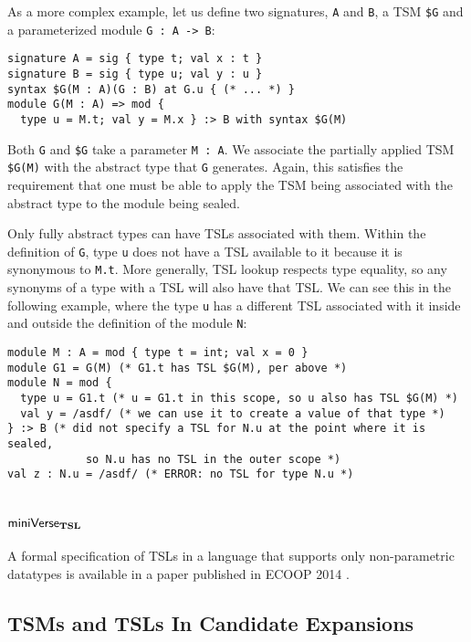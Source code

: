 As a more complex example, let us define two signatures, \lstinline{A} and \lstinline{B}, a TSM \texttt{\$G} and a parameterized module \lstinline{G : A -> B}:
\begin{lstlisting}[numbers=none,mathescape=|]
signature A = sig { type t; val x : t }
signature B = sig { type u; val y : u }
syntax $G(M : A)(G : B) at G.u { (* ... *) }
module G(M : A) => mod { 
  type u = M.t; val y = M.x } :> B with syntax $G(M)
\end{lstlisting}
Both \lstinline{G} and \texttt{\$G} take a parameter \lstinline{M : A}. We associate the partially applied TSM \texttt{\$G(M)} with the abstract type that \lstinline{G} generates. Again, this satisfies the requirement that one must be able to apply the TSM being associated with the abstract type to the module being sealed. 

Only fully abstract types can have TSLs associated with them. Within the definition of \lstinline{G}, type \lstinline{u} does not have a TSL available to it because it is synonymous to \lstinline{M.t}. More generally, TSL lookup respects type equality, so any synonyms of a type with a TSL will also have that TSL. We can see this in the following example, where the type \lstinline{u} has a different TSL associated with it inside and outside the definition of the module \lstinline{N}:
\begin{lstlisting}[numbers=none,mathescape=|]
module M : A = mod { type t = int; val x = 0 }
module G1 = G(M) (* G1.t has TSL $G(M), per above *)
module N = mod { 
  type u = G1.t (* u = G1.t in this scope, so u also has TSL $G(M) *)
  val y = /asdf/ (* we can use it to create a value of that type *) 
} :> B (* did not specify a TSL for N.u at the point where it is sealed, 
            so N.u has no TSL in the outer scope *)
val z : N.u = /asdf/ (* ERROR: no TSL for type N.u *)
\end{lstlisting}

\section{\texorpdfstring{$\mathsf{miniVerse}_\textbf{TSL}$}{miniVerseTSL}}
A formal specification of TSLs in a language that supports only non-parametric datatypes is available in a paper published in ECOOP 2014 \cite{TSLs}. %

\subsection{TSMs and TSLs In Candidate Expansions}\label{sec:tsms-in-expansions}


